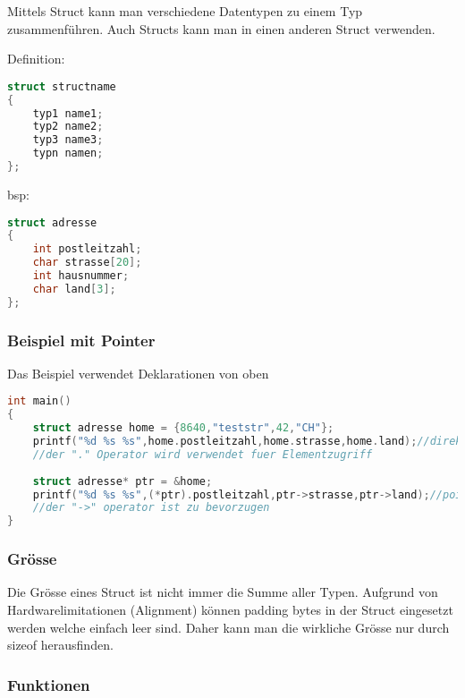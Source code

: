 Mittels Struct kann man verschiedene Datentypen zu einem Typ zusammenführen. Auch Structs kann man in einen anderen Struct verwenden.\newline

\noindent
\begin{minipage}{0.5\columnwidth}
Definition:
\begin{lstlisting}[language = c]
struct structname
{
    typ1 name1;
    typ2 name2;
    typ3 name3;
    typn namen;
};
\end{lstlisting}
\end{minipage}
\begin{minipage}{0.5\columnwidth}
bsp:
\begin{lstlisting}[language = c]
struct adresse
{
    int postleitzahl;
    char strasse[20];
    int hausnummer;
    char land[3];
};
\end{lstlisting}
\end{minipage}

\subsubsection{Beispiel mit Pointer}

Das Beispiel verwendet Deklarationen von oben

\begin{lstlisting}[language = c]
int main()
{
    struct adresse home = {8640,"teststr",42,"CH"};
    printf("%d %s %s",home.postleitzahl,home.strasse,home.land);//direkter zugriff
    //der "." Operator wird verwendet fuer Elementzugriff
    
    struct adresse* ptr = &home;
    printf("%d %s %s",(*ptr).postleitzahl,ptr->strasse,ptr->land);//pointer zugriff
    //der "->" operator ist zu bevorzugen
}
\end{lstlisting}

\subsubsection{Grösse}

Die Grösse eines Struct ist nicht immer die Summe aller Typen. Aufgrund von Hardwarelimitationen (Alignment) können padding bytes in der Struct eingesetzt werden welche einfach leer sind. Daher kann man die wirkliche Grösse nur durch sizeof herausfinden.

\subsubsection{Funktionen}

